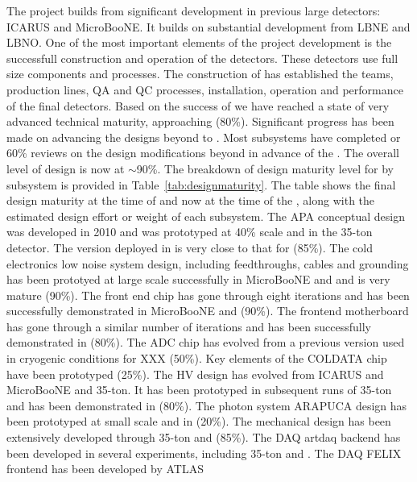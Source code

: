 The  project builds from significant development in
previous large  detectors: ICARUS and MicroBooNE. It
builds on substantial development from LBNE and LBNO. One of the most
important elements of the project development is the successfull
construction and operation of the  detectors. These detectors
use full size  components and processes. The construction of
 has established the teams, production lines, QA and QC
processes, installation, operation and performance of the final
 detectors. Based on the success of  we have
reached a state of very advanced technical maturity, approaching
(80\%). Significant progress has been made on advancing the designs
beyond  to . Most subsystems have completed 
or 60\% reviews on the design modifications beyond  in
advance of the . The overall level of design is now at
$\sim$90\%. The breakdown of design maturity level for  by
subsystem is provided in Table~\ref{tab:designmaturity}. The table
shows the final  design maturity at the time of  and now
at the time of the , along with the estimated design effort or
weight of each subsystem. The APA conceptual design was developed in
2010 and was prototyped at 40\% scale and in the 35-ton detector. The
version deployed in  is very close to that for 
(85\%). The cold electronics low noise system design, including
feedthroughs, cables and grounding has been prototyed at large scale
successfully in MicroBooNE and  and is very mature
(90\%). The front end chip has gone through eight iterations and has
been successfully demonstrated in MicroBooNE and 
(90\%). The frontend motherboard has gone through a similar number of
iterations and has been successfully demonstrated in 
(80\%). The ADC chip has evolved from a previous version used in
cryogenic conditions for XXX (50\%). Key elements of the COLDATA chip
have been prototyped (25\%). The HV design has evolved from ICARUS and
MicroBooNE and 35-ton. It has been prototyped in subsequent runs of
35-ton and has been demonstrated in  (80\%). The photon
system ARAPUCA design has been prototyped at small scale and in
 (20\%). The mechanical design has been extensively
developed through 35-ton and  (85\%). The DAQ artdaq
backend has been developed in several experiments, including 35-ton
and . The DAQ FELIX frontend has been developed by ATLAS
